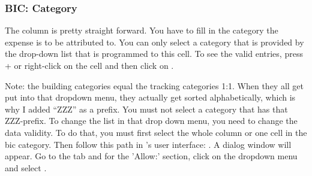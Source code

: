 \subsubsection{BIC: Category}
\label{subsubsec:bic-category}

The column  is pretty straight forward.
You have to fill in the category the expense is to be attributed to.
You can only select a category that is provided by the drop-down list that is programmed to this cell.
To see the valid entries, press +\keystroke{\( \downarrow \)} or right-click on the cell and then click on .

Note: the building categories equal the tracking categories 1:1.
When they all get put into that dropdown menu, they actually get sorted alphabetically, which is why I added ``ZZZ'' as a prefix.
You must not select a category that has that ZZZ-prefix.
To change the list in that drop down menu, you need to change the data validity.
To do that, you must first select the whole column or one cell in the \ac{bic} category. 
Then follow this path in \loc's user interface: \structurenext{}.
A dialog window will appear.
Go to the tab  and for the 'Allow:' section, click on the dropdown menu and select .